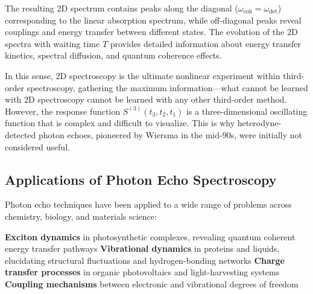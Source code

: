 \noindent The resulting 2D spectrum contains peaks along the diagonal ($\omega_{\text{coh}} = \omega_{\text{det}}$) corresponding to the linear absorption spectrum, while off-diagonal peaks reveal couplings and energy transfer between different states. The evolution of the 2D spectra with waiting time $T$ provides detailed information about energy transfer kinetics, spectral diffusion, and quantum coherence effects.

\noindent In this sense, 2D spectroscopy is the ultimate nonlinear experiment within third-order spectroscopy, gathering the maximum information—what cannot be learned with 2D spectroscopy cannot be learned with any other third-order method. However, the response function $S^{(3)}(t_3, t_2, t_1)$ is a three-dimensional oscillating function that is complex and difficult to visualize. This is why heterodyne-detected photon echoes, pioneered by Wiersma in the mid-90s, were initially not considered useful.

\subsection{Applications of Photon Echo Spectroscopy}
\label{subsec:echo_applications}

\noindent Photon echo techniques have been applied to a wide range of problems across chemistry, biology, and materials science:

\textbf{Exciton dynamics} in photosynthetic complexes, revealing quantum coherent energy transfer pathways %
\textbf{Vibrational dynamics} in proteins and liquids, elucidating structural fluctuations and hydrogen-bonding networks \cite{hammzanni2011conceptsmethods2d}
\textbf{Charge transfer processes} in organic photovoltaics and light-harvesting systems
\textbf{Coupling mechanisms} between electronic and vibrational degrees of freedom \cite{khaliletal2004vibrationalcoherencetransfer}




